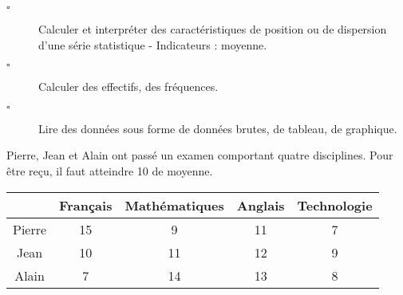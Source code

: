 \documentclass[openany]{book}
\begin{document}
\begin{seance}[Statistiques]

\begin{description}
\item[$\square$] Calculer et interpréter des caractéristiques de position ou de dispersion d’une série statistique - Indicateurs : moyenne.
\item[$\square$] Calculer des effectifs, des fréquences.
\item[$\square$] Lire des données sous forme de données brutes, de tableau, de graphique.
\end{description}
\end{seance}


\Exe


Pierre, Jean et Alain ont passé un examen comportant quatre
disciplines. Pour être reçu, il faut atteindre 10 de moyenne.

\begin{center}
  \begin{tabular}{|c|c|c|c|c|}
\cline{2-5}
\multicolumn{1}{c|}{}&Français&Mathématiques&Anglais&Technologie\\
\hline
Pierre&15&9&11&7\\
\hline
Jean&10&11&12&9\\
\hline
Alain&7&14&13&8\\
\hline
  \end{tabular}
\end{center}
\end{document}
